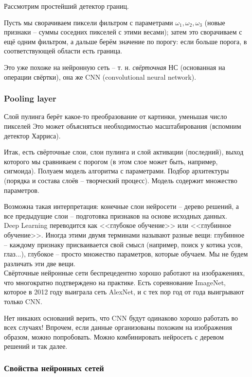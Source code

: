 \documentclass[main.tex]{subfiles}
\begin{document}
Рассмотрим простейший детектор границ.

Пусть мы сворачиваем пиксели фильтром с параметрами $\omega_1, \omega_2, \omega_3$ (новые признаки -- суммы соседних пикселей с этими весами); затем это сворачиваем с ещё одним фильтром, а дальше берём значение по порогу: если больше порога, в соответствующей области есть граница.

Это уже похоже на нейронную сеть -- т. н. \emph{свёрточная} НС (основанная на операции свёртки), она же CNN (convolutional neural network).

\subsubsection{Pooling layer}

Слой пулинга берёт какое-то преобразование от картинки, уменьшая число пикселей %
Это может объясняться необходимостью масштабирования (вспомним детектор Харриса).

Итак, есть свёрточные слои, слои пулинга и слой активации (последний), выход которого мы сравниваем с порогом (в этом слое может быть, например, сигмоида).
Полуаем модель алгоритма с параметрами.
Подбор архитектуры (порядка и состава слоёв -- творческий процесс).
Модель содержит множество параметров.

Возможна такая интерпретация: конечные слои нейросети -- дерево решений, а все предыдущие слои -- подготовка признаков на основе исходных данных. \\

Deep Learning переводится как <<глубокое обучение>> или <<глубинное обучение>>.
Иногда этими двумя терминами называют разные вещи: глубинное -- каждому признаку присваивается свой смысл (например, поиск у котика усов, глаз...), глубокое -- просто множество параметров, которые обучаем.
Мы не будем различать эти две вещи. \\

Свёрточные нейронные сети беспрецедентно хорошо работают на изображениях, что многократно подтверждено на практике.
Есть соревнование ImageNet, которое в 2012 году выиграла сеть AlexNet, и с тех пор год от года выигрывают только CNN.

Нет никаких оснований верить, что CNN будут одинаково хорошо работать во всех случаях!
Впрочем, если данные организованы похожим на изображения образом, можно попробовать.
Можно комбинировать нейросеть с деревом решений и так далее.

\subsubsection{Свойства нейронных сетей}
\end{document}
